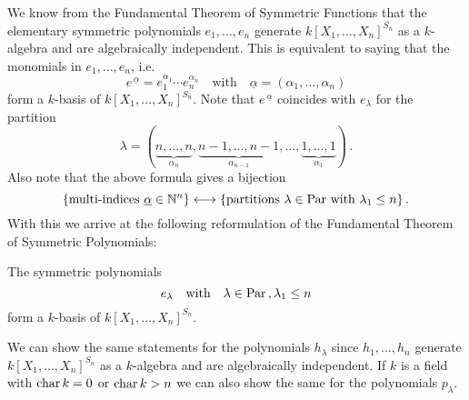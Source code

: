 \begin{fluff}
  We know from the Fundamental Theorem of Symmetric Functions that the elementary symmetric polynomials $e_1, \dotsc, e_n$ generate $k[X_1, \dotsc, X_n]^{S_n}$ as a $k$-algebra and are algebraically independent. This is equivalent to saying that the monomials in $e_1, \dotsc, e_n$, i.e.\
  \[
      e^{\,\underline{\alpha}}
    = e_1^{\alpha_1} \dotsm e_n^{\alpha_n}
    \quad\text{with}\quad
      \underline{\alpha}
    = (\alpha_1, \dotsc, \alpha_n)
  \]
  form a $k$-basis of $k[X_1, \dotsc, X_n]^{S_n}$.
  Note that $e^{\,\underline{\alpha}}$ coincides with $e_\lambda$ for the partition
  \[
    \lambda
  = (
      \underbrace{n, \dotsc, n}_{\alpha_n},
      \underbrace{n-1, \dotsc, n-1}_{\alpha_{n-1}},
      \dotsc,
      \underbrace{1, \dotsc, 1}_{\alpha_1}
    ) \,.
  \]
  Also note that the above formula gives a bijection
  \[
    \{ \text{multi-indices $\underline{\alpha} \in \mathbb{N}^n$} \}
    \longleftrightarrow
    \{ \text{partitions $\lambda \in \operatorname{Par}$ with $\lambda_1 \leq n$} \} \,.
  \]
  With this we arrive at the following reformulation of the Fundamental Theorem of Symmetric Polynomials:
\end{fluff}


\begin{corollary}
  The symmetric polynomials
  \[
      e_\lambda
    \quad\text{with}\quad
      \lambda \in \operatorname{Par} \,,
      \lambda_1 \leq n
  \]
  form a $k$-basis of $k[X_1, \dotsc, X_n]^{S_n}$.
\end{corollary}


\begin{remark}
  We can show the same statements for the polynomials $h_\lambda$ since $h_1, \dotsc, h_n$ generate $k[X_1, \dotsc, X_n]^{S_n}$ as a $k$-algebra and are algebraically independent.
  If $k$ is a field with $\operatorname{char} k = 0$ or $\operatorname{char} k > n$ we can also show the same for the polynomials $p_\lambda$.
\end{remark}


